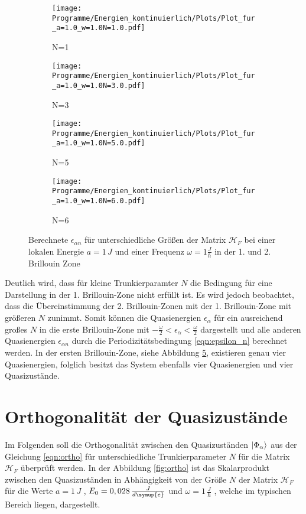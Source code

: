 \begin{figure}
  \centering
  \begin{subfigure}{0.48\textwidth}
    \texttt{[image: Programme/Energien\_kontinuierlich/Plots/Plot\_fur\_a=1.0\_w=1.0N=1.0.pdf]}
    \caption{N=1}
    \label{fig=N_1}
  \end{subfigure}
  \begin{subfigure}{0.48\textwidth}
    \texttt{[image: Programme/Energien\_kontinuierlich/Plots/Plot\_fur\_a=1.0\_w=1.0N=3.0.pdf]}
    \caption{N=3}
    \label{fig=N_3}
  \end{subfigure}
  \begin{subfigure}{0.48\textwidth}
    \texttt{[image: Programme/Energien\_kontinuierlich/Plots/Plot\_fur\_a=1.0\_w=1.0N=5.0.pdf]}
    \caption{N=5}
    \label{fig=N_5}
  \end{subfigure}
  \begin{subfigure}{0.48\textwidth}
    \texttt{[image: Programme/Energien\_kontinuierlich/Plots/Plot\_fur\_a=1.0\_w=1.0N=6.0.pdf]}
    \caption{N=6}
    \label{fig=N_6}
  \end{subfigure}
  \caption{Berechnete $\epsilon_{\alpha n}$ für unterschiedliche Größen der Matrix $\mathcal{H}_F$
  bei einer lokalen Energie $a=1\,J$ und einer Frequenz $\omega=1\frac{J}{\hbar}$ in der 1. und 2. Brillouin Zone}
  \label{fig:brillouin}
\end{figure}

Deutlich wird, dass für kleine Trunkierparamter $N$ die Bedingung für eine Darstellung in der 1. Brillouin-Zone nicht erfüllt ist.
Es wird jedoch beobachtet, dass die Übereinstimmung der 2. Brillouin-Zonen mit der  1. Brillouin-Zone mit
größeren $N$ zunimmt.
Somit können die Quasienergien $\epsilon_\alpha$  für ein ausreichend großes $N$ in die erste Brillouin-Zone
mit $-\frac{\omega}{2}<\epsilon_\alpha<\frac{\omega}{2}$ dargestellt und
alle anderen Quasienergien $\epsilon_{\alpha n}$ durch die Periodizitätsbedingung \eqref{eqn:epsilon_n} berechnet werden.
In der ersten Brillouin-Zone, siehe Abbildung \ref{fig:brillouin}, existieren genau vier Quasienergien, folglich besitzt das System
ebenfalls vier Quasienergien und vier Quasizustände.

\section{Orthogonalität der Quasizustände}
Im Folgenden soll die Orthogonalität zwischen den Quasizuständen $\ket{\Phi_\alpha}$ aus der Gleichung \eqref{eqn:ortho} für
unterschiedliche Trunkierparameter $N$ für die Matrix $\mathcal{H}_F$ überprüft werden.
In der Abbildung \ref{fig:ortho} ist das Skalarprodukt zwischen den Quasizuständen in Abhängigkeit von der Größe $N$ der Matrix
$\mathcal{H}_F$
für die Werte    $a=1\, J$ , $E_0=0,028\,\frac{J}{d\symup{e}}$  und $\omega=1\,\frac{J}{\hbar}$ , welche im typischen Bereich liegen,
dargestellt.


